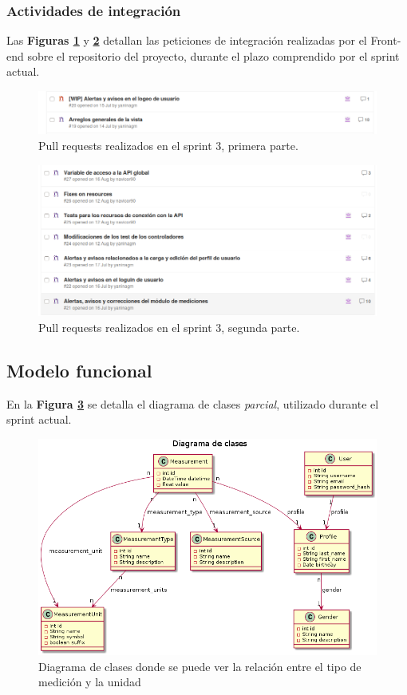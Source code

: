 \subsubsection{Actividades de integración}

Las \textbf{Figuras \ref{pull_request_sprint_3}} y \textbf{\ref{3-PR_back}} detallan las peticiones de integración realizadas por el Front-end sobre el repositorio del proyecto, durante el plazo comprendido por el sprint actual.

\begin{figure}[h]
  \centering
  \includegraphics[width=.8\textwidth]{img/3-PR_1_front}
  \caption{Pull requests realizados en el sprint 3, primera parte.}
  \label{pull_request_sprint_3}
\end{figure}
\begin{figure}[h]
  \centering
  \includegraphics[width=.8\textwidth]{img/3-PR_2_front}
  \caption{Pull requests realizados en el sprint 3, segunda parte.}
  \label{3-PR_back}
\end{figure}

\subsection{Modelo funcional}
\label{3-clases_involucradas}

En la \textbf{Figura \ref{relacion_tipo}} se detalla el diagrama de clases \textit{parcial}, utilizado durante el sprint actual.

\begin{figure}[h]
	\centering
	\includegraphics[width=.8\textwidth]{img/3-diagramaClases_relacionTipos}
	\caption{Diagrama de clases donde se puede ver la relación entre el tipo de medición y la unidad}
	\label{relacion_tipo}
\end{figure}


